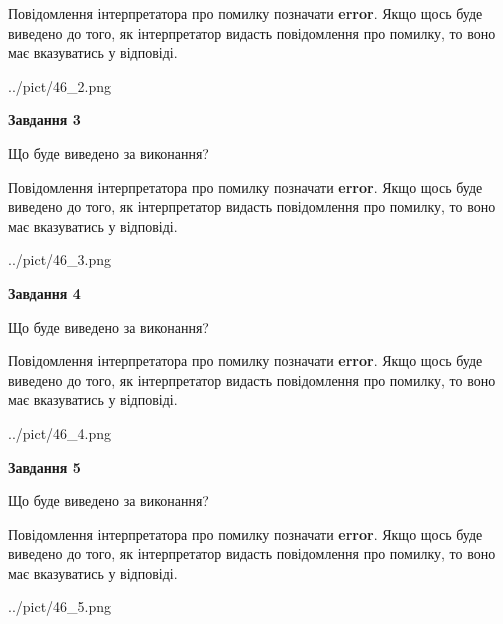 \documentclass[12pt, ukrainian]{article}
\begin{document}
{\begin {large}
Повідомлення інтерпретатора про помилку позначати \textbf{error}.
Якщо щось буде виведено до того, як інтерпретатор видасть повідомлення про помилку, 
то воно має вказуватись у відповіді. \par


\begin{center}
	{../pict/46_2.png}
\end{center}
\newpage

{\begin {center}\textbf{Завдання 3}\end {center}}\par
Що буде виведено за виконання?

Повідомлення інтерпретатора про помилку позначати \textbf{error}.
Якщо щось буде виведено до того, як інтерпретатор видасть повідомлення про помилку, 
то воно має вказуватись у відповіді. \par


\begin{center}
	{../pict/46_3.png}
\end{center}
\newpage

{\begin {center}\textbf{Завдання 4}\end {center}}\par
Що буде виведено за виконання?

Повідомлення інтерпретатора про помилку позначати \textbf{error}.
Якщо щось буде виведено до того, як інтерпретатор видасть повідомлення про помилку, 
то воно має вказуватись у відповіді. \par


\begin{center}
	{../pict/46_4.png}
\end{center}
\newpage

{\begin {center}\textbf{Завдання 5}\end {center}}\par
Що буде виведено за виконання?

Повідомлення інтерпретатора про помилку позначати \textbf{error}.
Якщо щось буде виведено до того, як інтерпретатор видасть повідомлення про помилку, 
то воно має вказуватись у відповіді. \par


\begin{center}
	{../pict/46_5.png}
\end{center}
\newpage


\end{large}}
\end{document}
